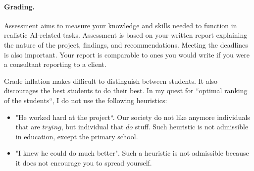 \paragraph{Grading.}
Assessment aims to measure your knowledge and skills needed to function in realistic AI-related tasks.
Assessment is based on your written report explaining the nature of the project, findings, and recommendations. 
Meeting the deadlines is also important.
Your report is comparable to ones you would write if you were a consultant reporting to a client.

Grade inflation makes difficult to distinguish between students.
It also discourages the best students to do their best.
In my quest for ``optimal ranking of the students``, I do not use the following heuristics:

\begin{itemize}
 \item "He worked hard at the project``. 
Our society do not like anymore individuals that are $trying$, but individual that $do$ stuff.
Such heuristic is not admissible in education, except the primary school.

\item "I knew he could do much better". 
Such a heuristic is not admissible because it does not encourage you to spread yourself.
\end{itemize}

